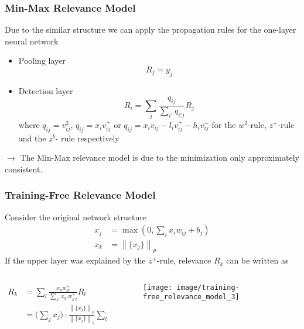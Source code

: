 \documentclass{beamer}
\newcommand\norm[1]{\left\lVert#1\right\rVert}
\begin{document}
\begin{frame}
\frametitle{Min-Max Relevance Model}
Due to the similar structure we can apply the propagation rules for the one-layer neural network
\begin{itemize}
\item Pooling layer
\begin{equation*}
R_j = y_j
\end{equation*}

\item Detection layer
\begin{equation*}
R_i = \sum_j \frac{q_{ij}}{\sum_{i'} q_{i'j}} R_j
\end{equation*}
where $q_{ij}= v_{ij}^2$, $q_{ij}= x_i v_{ij}^+$ or $q_{ij}= x_i v_{ij} - l_i v_{ij}^+ - h_i v_{ij}^-$ for the $w^2$-rule, $z^+$-rule and the $z^b$- rule respectively
\end{itemize}
\vspace{0.5cm}

$\rightarrow$ The Min-Max relevance model is due to the minimization only approximately consistent.
\end{frame}



\begin{frame}
\frametitle{Training-Free Relevance Model}
Consider the original network structure
\begin{align*}
x_j &= \max(0,\sum_ix_i w_{ij} + b_j)\\
x_k &= \norm{\{x_j\}}_p
\end{align*}
If the upper layer was explained by the $z^+$-rule, relevance $R_k$ can be written as


 \begin{columns}
          \begin{column}{5cm}
			\begin{align*}
			R_k &= \sum_l \frac{x_k w_{kl}^+}{\sum_{k'} x_{k'} w_{k'l}^+} R_l\\
				&= \bigl( \sum_j x_j \bigr)\cdot \frac{\norm{\{x_j\}}_p}{\norm{\{x_j\}}_1}   \sum_l \frac{w_{kl}^+R_l}{\sum_{k'} x_{k'} w_{k'l}^+} 
			\end{align*}
            \end{column} 
            \begin{column}{5cm}
			\begin{figure}
			\label{fig1}
			\texttt{[image: image/training-free\_relevance\_model\_3]}
			\end{figure}
	\end{column}
\end{columns} 

\end{frame}
\end{document}

